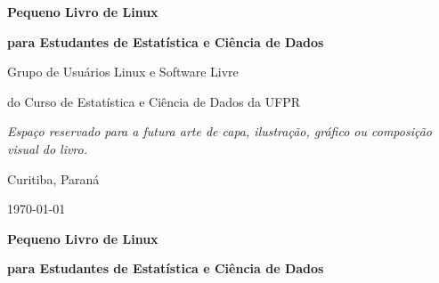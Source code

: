 \documentclass[12pt,openany]{book}
\newcommand{\placeholder}[1]{
    \par\medskip
    \noindent\textit{#1}
    \par\medskip
}
\begin{document}

\begin{titlepage}
    \thispagestyle{empty}
    \centering

    \vspace*{3cm}

    {\Huge\bfseries Pequeno Livro de Linux\par}
    \vspace{0.5cm}
    {\Large\bfseries para Estudantes de Estatística e Ciência de Dados\par}

    \vspace{3cm}

    {\Large Grupo de Usuários Linux e Software Livre\par}
    {\Large do Curso de Estatística e Ciência de Dados da UFPR\par}

    \vfill

    \placeholder{Espaço reservado para a futura arte de capa, ilustração, gráfico ou composição visual do livro.}

    \vfill

    {\large Curitiba, Paraná\par}
    {\large \today\par}
\end{titlepage}


\cleardoublepage
{}
\setcounter{page}{2}

\begin{titlepage}
    \thispagestyle{plain}
    \centering

    \vspace*{6cm}

    {\Huge\bfseries Pequeno Livro de Linux\par}
    \vspace{0.5cm}
    {\Large\bfseries para Estudantes de Estatística e Ciência de Dados\par}

    \vfill
\end{titlepage}

\end{document}
